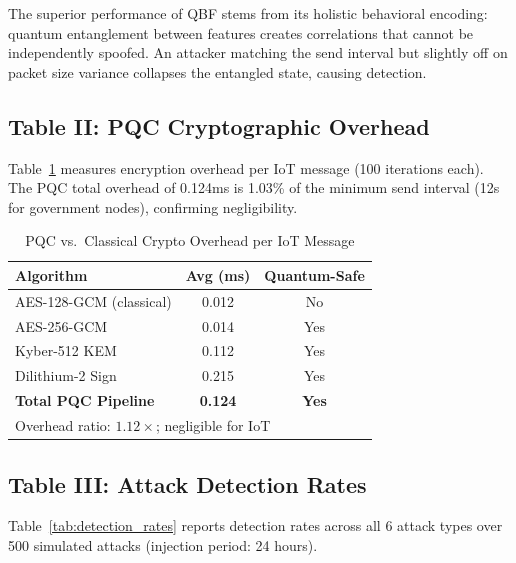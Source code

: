 The superior performance of QBF stems from its holistic behavioral encoding:
quantum entanglement between features creates correlations that cannot be
independently spoofed. An attacker matching the send interval but slightly
off on packet size variance collapses the entangled state, causing detection.

\subsection{Table II: PQC Cryptographic Overhead}

Table~\ref{tab:crypto_overhead} measures encryption overhead per IoT message
(100 iterations each). The PQC total overhead of 0.124ms is 1.03\% of the
minimum send interval (12s for government nodes), confirming negligibility.

\begin{table}[h]
\caption{PQC vs.\ Classical Crypto Overhead per IoT Message}
\label{tab:crypto_overhead}
\centering
\begin{tabular}{lcc}
\toprule
\textbf{Algorithm}          & \textbf{Avg (ms)} & \textbf{Quantum-Safe} \\
\midrule
AES-128-GCM (classical)     & 0.012 & No  \\
AES-256-GCM                 & 0.014 & Yes \\
Kyber-512 KEM               & 0.112 & Yes \\
Dilithium-2 Sign            & 0.215 & Yes \\
\textbf{Total PQC Pipeline} & \textbf{0.124} & \textbf{Yes} \\
\midrule
\multicolumn{3}{l}{\small Overhead ratio: $1.12\times$; negligible for IoT}
\end{tabular}
\end{table}

\subsection{Table III: Attack Detection Rates}

Table~\ref{tab:detection_rates} reports detection rates across all 6 attack types
over 500 simulated attacks (injection period: 24 hours).

